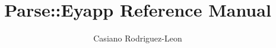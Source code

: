 \documentclass{article}
\title{Parse::Eyapp Reference Manual}
\author{Casiano Rodriguez-Leon}
\begin{document}
\maketitle

\tableofcontents 

\pagebreak
\end{document}
